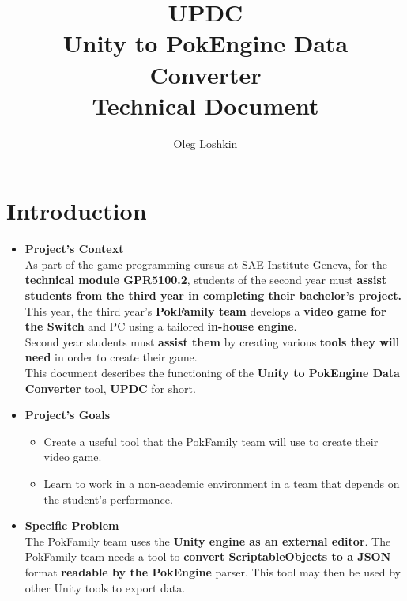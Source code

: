 \documentclass[12pt,a4paper]{article}
\author{Oleg Loshkin}
\title{\textbf{UPDC}\\Unity to PokEngine Data Converter\\\textbf{Technical Document}}
\begin{document}
\maketitle
\section{Introduction}
	\begin{itemize}
		\item \textbf{Project's Context}
		\\As part of the game programming cursus at SAE Institute Geneva, for the \textbf{technical module GPR5100.2}, students of the second year must \textbf{assist students from the third year in completing their bachelor’s project.}\\ This year, the third year's \textbf{PokFamily team} develops a \textbf{video game for the Switch} and PC using a tailored \textbf{in-house engine}.\\Second year students must \textbf{assist them} by creating various \textbf{tools they will need} in order to create their game.\\This document describes the functioning of the \textbf{Unity to PokEngine Data Converter} tool, \textbf{UPDC} for short.
		
		\item \textbf{Project's Goals}
			\begin{itemize}
				\item Create a useful tool that the PokFamily team will use to create their video game.
				
				\item Learn to work in a non-academic environment in a team that depends on the student’s performance.
				
			\end{itemize}
			
		\item \textbf{Specific Problem}
		\\The PokFamily team uses the \textbf{Unity engine as an external editor}. The PokFamily team needs a tool to \textbf{convert ScriptableObjects to a JSON} format \textbf{readable by the PokEngine} parser. This tool may then be used by other Unity tools to export data.
	\end{itemize}
\newpage
\end{document}

